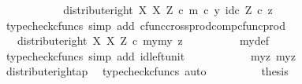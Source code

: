 \begin{isabellebody}
\ \ \ \ \ \ \isamarkupfalse%
\ \isamarkupfalse%
\ {\isachardoublequoteopen}{\isachardot}{\kern0pt}{\isachardot}{\kern0pt}{\isachardot}{\kern0pt}\ {\isacharequal}{\kern0pt}\ distribute{\isacharunderscore}{\kern0pt}right\ X\ X\ Z\ {\isasymcirc}\isactrlsub c\ {\isasymlangle}m\ {\isasymcirc}\isactrlsub c\ y{\isacharcomma}{\kern0pt}\ id\isactrlsub c\ Z\ {\isasymcirc}\isactrlsub c\ z{\isasymrangle}{\isachardoublequoteclose}\isanewline
\ \ \ \ \ \ \ \ \isamarkupfalse%
\ {\isacharparenleft}{\kern0pt}typecheck{\isacharunderscore}{\kern0pt}cfuncs{\isacharcomma}{\kern0pt}\ simp\ add{\isacharcolon}{\kern0pt}\ cfunc{\isacharunderscore}{\kern0pt}cross{\isacharunderscore}{\kern0pt}prod{\isacharunderscore}{\kern0pt}comp{\isacharunderscore}{\kern0pt}cfunc{\isacharunderscore}{\kern0pt}prod{\isacharparenright}{\kern0pt}\isanewline
\ \ \ \ \ \ \isamarkupfalse%
\ \isamarkupfalse%
\ {\isachardoublequoteopen}{\isachardot}{\kern0pt}{\isachardot}{\kern0pt}{\isachardot}{\kern0pt}\ {\isacharequal}{\kern0pt}\ distribute{\isacharunderscore}{\kern0pt}right\ X\ X\ Z\ {\isasymcirc}\isactrlsub c\ {\isasymlangle}{\isasymlangle}my{}{\isacharcomma}{\kern0pt}my{}{\isasymrangle}{\isacharcomma}{\kern0pt}\ z{\isasymrangle}{\isachardoublequoteclose}\isanewline
\ \ \ \ \ \ \ \ \isamarkupfalse%
\ my{\isacharunderscore}{\kern0pt}def\ \isamarkupfalse%
\ {\isacharparenleft}{\kern0pt}typecheck{\isacharunderscore}{\kern0pt}cfuncs{\isacharcomma}{\kern0pt}\ simp\ add{\isacharcolon}{\kern0pt}\ id{\isacharunderscore}{\kern0pt}left{\isacharunderscore}{\kern0pt}unit{}{\isacharparenright}{\kern0pt}\isanewline
\ \ \ \ \ \ \isamarkupfalse%
\ \isamarkupfalse%
\ {\isachardoublequoteopen}{\isachardot}{\kern0pt}{\isachardot}{\kern0pt}{\isachardot}{\kern0pt}\ {\isacharequal}{\kern0pt}\ {\isasymlangle}{\isasymlangle}my{}{\isacharcomma}{\kern0pt}z{\isasymrangle}{\isacharcomma}{\kern0pt}\ {\isasymlangle}my{}{\isacharcomma}{\kern0pt}z{\isasymrangle}{\isasymrangle}{\isachardoublequoteclose}\isanewline
\ \ \ \ \ \ \ \ \isamarkupfalse%
\ distribute{\isacharunderscore}{\kern0pt}right{\isacharunderscore}{\kern0pt}ap\ \isamarkupfalse%
\ {\isacharparenleft}{\kern0pt}typecheck{\isacharunderscore}{\kern0pt}cfuncs{\isacharcomma}{\kern0pt}\ auto{\isacharparenright}{\kern0pt}\isanewline
\ \ \ \ \ \ \isamarkupfalse%
\ \isamarkupfalse%
\ {\isacharquery}{\kern0pt}thesis\isanewline

\end{isabellebody}
